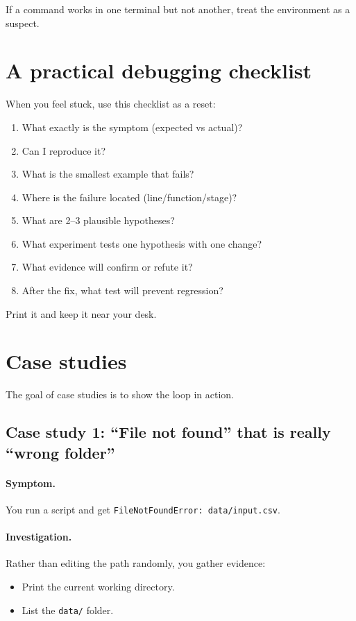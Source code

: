 If a command works in one terminal but not another, treat the environment as a suspect.

\section{A practical debugging checklist}
When you feel stuck, use this checklist as a reset:
\begin{enumerate}[noitemsep]
  \item What exactly is the symptom (expected vs actual)?
  \item Can I reproduce it?
  \item What is the smallest example that fails?
  \item Where is the failure located (line/function/stage)?
  \item What are 2--3 plausible hypotheses?
  \item What experiment tests one hypothesis with one change?
  \item What evidence will confirm or refute it?
  \item After the fix, what test will prevent regression?
\end{enumerate}

Print it and keep it near your desk.

\section{Case studies}
The goal of case studies is to show the loop in action.

\subsection{Case study 1: ``File not found'' that is really ``wrong folder''}
\paragraph{Symptom.} You run a script and get \texttt{FileNotFoundError: data/input.csv}.

\paragraph{Investigation.} Rather than editing the path randomly, you gather evidence:
\begin{itemize}[noitemsep]
  \item Print the current working directory.
  \item List the \texttt{data/} folder.
\end{itemize}

